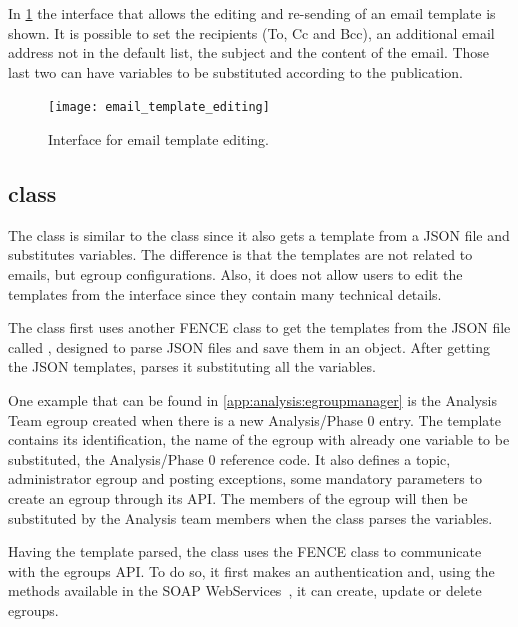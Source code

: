 In \cref{fig:email_template_editing} the interface that allows the editing and re-sending of an email template is shown. It is possible to set the recipients (To, Cc and Bcc), an additional email address not in the default list, the subject and the content of the email.
Those last two can have variables to be substituted according to the publication.

\begin{figure}[htb]
  \centering
  \texttt{[image: email\_template\_editing]}
  \caption{Interface for email template editing.}%
  \label{fig:email_template_editing}
\end{figure}


\subsection{ class}%
\label{sec:EgroupManager_class}

The  class is similar to the  class since it also gets a template from a JSON file and substitutes variables.
The difference is that the templates are not related to emails, but egroup configurations.
Also, it does not allow users to edit the templates from the interface since they contain many technical details.

The  class first uses another FENCE class to get the templates from the JSON file called , designed to parse JSON files and save them in an object.
After getting the JSON templates,  parses it substituting all the variables.

One example that can be found in \cref{app:analysis:egroupmanager} is the Analysis Team egroup created when there is a new Analysis/Phase 0 entry.
The template contains its identification, the name of the egroup with already one variable to be substituted, the Analysis/Phase 0 reference code.
It also defines a topic, administrator egroup and posting exceptions, some mandatory parameters to create an egroup through its API\@.
The members of the egroup will then be substituted by the Analysis team members when the  class parses the variables.

Having the template parsed, the  class uses the FENCE  class to communicate with the egroups API\@.
To do so, it first makes an authentication and, using the methods available in the SOAP WebServices~\cite{egroups}, it can create, update or delete egroups.


